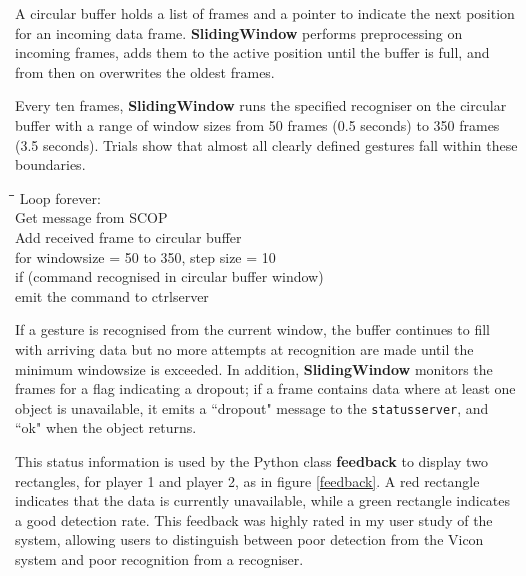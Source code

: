 \documentclass[12pt,a4,notitlepage]{report}
\renewcommand{\_}{\texttt{\symbol{95}}}
\newcommand{\<}{\texttt{\symbol{60}}}
\renewcommand{\>}{\texttt{\symbol{62}}}
\newcommand{\class}[1]{\textbf{#1}}
\newcommand{\variable}[1]{\texttt{#1}}
\newenvironment{pseudocode}{\begin{slshape}\begin{tabbing}\hspace*{0.5cm}\=\hspace*{0.5cm}\=\hspace*{0.5cm}\= \kill }{\end{tabbing}\end{slshape}}
\begin{document}
A circular buffer holds a list of frames and a pointer to indicate the next position for an incoming data frame. \class{SlidingWindow} performs preprocessing on  incoming frames, adds them to the active position until the buffer is full, and from then on overwrites the oldest frames.

Every ten frames, \class{SlidingWindow} runs the specified recogniser on the circular buffer with a range of window sizes from 50 frames (0.5 seconds) to 350 frames (3.5 seconds). Trials show that almost all clearly defined gestures fall within these boundaries.

\begin{pseudocode}
Loop forever: \\
\>	Get message from SCOP \\
\>	Add received frame to circular buffer \\
\>\>    for windowsize = 50 to 350, step size = 10 \\
\>\>        if (command recognised in circular buffer window) \\
\>\>\>           emit the command to ctrlserver
\end{pseudocode}

If a gesture is recognised from the current window, the buffer continues to fill with arriving data but no more attempts at recognition are made until the minimum windowsize is exceeded. In addition, \class{SlidingWindow} monitors the frames for a flag indicating a dropout; if a frame contains data where at least one object is unavailable, it emits a ``dropout" message to the \variable{statusserver}, and ``ok" when the object returns.

This status information is used by the Python class \class{feedback} to display two rectangles, for player 1 and player 2, as in figure \ref{feedback}. A red rectangle indicates that the data is currently unavailable, while a green rectangle indicates a good detection rate. This feedback was highly rated in my user study of the system, allowing users to distinguish between poor detection from the Vicon system and poor recognition from a recogniser.
\end{document}
